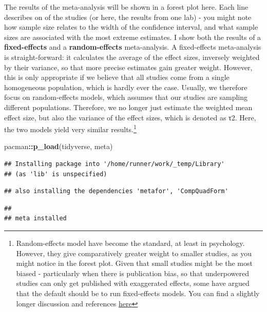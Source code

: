 \documentclass[
]{book}
\newenvironment{Shaded}{\begin{snugshade}}{\end{snugshade}}
\newcommand{\KeywordTok}[1]{\textcolor[rgb]{0.13,0.29,0.53}{\textbf{#1}}}
\newcommand{\NormalTok}[1]{#1}
\newcommand{\OperatorTok}[1]{\textcolor[rgb]{0.81,0.36,0.00}{\textbf{#1}}}
\begin{document}
The results of the meta-analysis will be shown in a forest plot here. Each line describes on of the studies (or here, the results from one lab) - you might note how sample size relates to the width of the confidence interval, and what sample sizes are associated with the most extreme estimates. I show both the results of a \textbf{fixed-effects} and a \textbf{random-effects} meta-analysis. A fixed-effects meta-analysis is straight-forward: it calculates the average of the effect sizes, inversely weighted by their variance, so that more precise estimates gain greater weight. However, this is only appropriate if we believe that all studies come from a single homogeneous population, which is hardly ever the case. Usually, we therefore focus on random-effects models, which assumes that our studies are sampling different populations. Therefore, we no longer just estimate the weighted mean effect size, but also the variance of the effect sizes, which is denoted as τ2. Here, the two models yield very similar results.\footnote{Random-effects model have become the standard, at least in psychology. However, they give comparatively greater weight to smaller studies, as you might notice in the forest plot. Given that small studies might be the most biased - particularly when there is publication bias, so that underpowered studies can only get published with exaggerated effects, some have argued that the default should be to run fixed-effects models. You can find a slightly longer discussion and references \href{https://bookdown.org/MathiasHarrer/Doing_Meta_Analysis_in_R/random.html}{here}}

\begin{Shaded}
\begin{Highlighting}[]
\NormalTok{pacman}\OperatorTok{::}\KeywordTok{p_load}\NormalTok{(tidyverse, meta)}
\end{Highlighting}
\end{Shaded}

\begin{verbatim}
## Installing package into '/home/runner/work/_temp/Library'
## (as 'lib' is unspecified)
\end{verbatim}

\begin{verbatim}
## also installing the dependencies 'metafor', 'CompQuadForm'
\end{verbatim}

\begin{verbatim}
## 
## meta installed
\end{verbatim}
\end{document}
